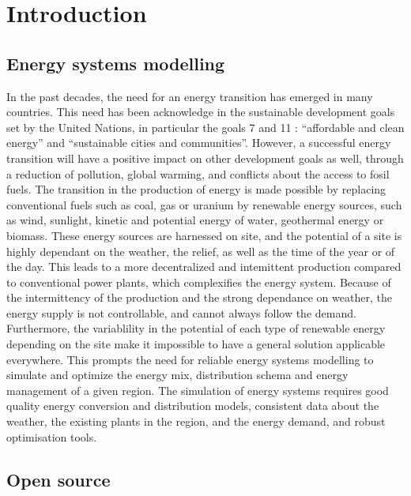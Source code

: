 \chapter{Introduction}
\label{chap:introduction}

\section{Energy systems modelling}

In the past decades, the need for an energy transition has emerged in many countries. This need has been acknowledge in the sustainable development goals \cite{un_sdgs} set by the United Nations, in particular the goals 7 \cite{un_sdg7} and 11 \cite{un_sdg11} : ``affordable and clean energy'' and ``sustainable cities and communities''. However, a successful energy transition will have a positive impact on other development goals as well, through a reduction of pollution, global warming, and conflicts about the access to fosil fuels. \newline
The transition in the production of energy is made possible by replacing conventional fuels such as coal, gas or uranium by renewable energy sources, such as wind, sunlight, kinetic and potential energy of water, geothermal energy or biomass. These energy sources are harnessed on site, and the potential of a site is highly dependant on the weather, the relief, as well as the time of the year or of the day. This leads to a more decentralized and intemittent production compared to conventional power plants, which complexifies the energy system. \newline
Because of the intermittency of the production and the strong dependance on weather, the energy supply is not controllable, and cannot always follow the demand. Furthermore, the variablility in the potential of each type of renewable energy depending on the site make it impossible to have a general solution applicable everywhere. This prompts the need for reliable energy systems modelling to simulate and optimize the energy mix, distribution schema and energy management of a given region. The simulation of energy systems requires good quality energy conversion and distribution models, consistent data about the weather, the existing plants in the region, and the energy demand, and robust optimisation tools.


\section{Open source}

